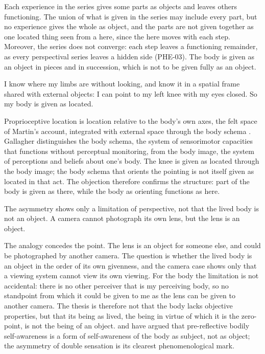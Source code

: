 \documentclass{situationist-preprint}
\begin{document}
\begin{reply}
Each experience in the series gives some parts as objects and leaves others functioning. The union of what is given in the series may include every part, but no experience gives the whole as object, and the parts are not given together as one located thing seen from a here, since the here moves with each step. Moreover, the series does not converge: each step leaves a functioning remainder, as every perspectival series leaves a hidden side (PHE-03). The body is given as an object in pieces and in succession, which is not to be given fully as an object.
\end{reply}

\begin{objection}\label{o:prop}
I know where my limbs are without looking, and know it in a spatial frame shared with external objects: I can point to my left knee with my eyes closed. So my body is given as located.
\end{objection}

\begin{reply}
Proprioceptive location is location relative to the body's own axes, the felt space of Martin's account, integrated with external space through the body schema \citep{Gallagher2005}. Gallagher distinguishes the body schema, the system of sensorimotor capacities that functions without perceptual monitoring, from the body image, the system of perceptions and beliefs about one's body. The knee is given as located through the body image; the body schema that orients the pointing is not itself given as located in that act. The objection therefore confirms the structure: part of the body is given as there, while the body as orienting functions as here.
\end{reply}

\begin{objection}\label{o:epis}
The asymmetry shows only a limitation of perspective, not that the lived body is not an object. A camera cannot photograph its own lens, but the lens is an object.
\end{objection}

\begin{reply}
The analogy concedes the point. The lens is an object for someone else, and could be photographed by another camera. The question is whether the lived body is an object in the order of its own givenness, and the camera case shows only that a viewing system cannot view its own viewing. For the body the limitation is not accidental: there is no other perceiver that is my perceiving body, so no standpoint from which it could be given to me as the lens can be given to another camera. The thesis is therefore not that the body lacks objective properties, but that its being as lived, the being in virtue of which it is the zero-point, is not the being of an object. \citet{Zahavi2005} and \citet{Legrand2006} have argued that pre-reflective bodily self-awareness is a form of self-awareness of the body as subject, not as object; the asymmetry of double sensation is its clearest phenomenological mark.
\end{reply}
\end{document}
